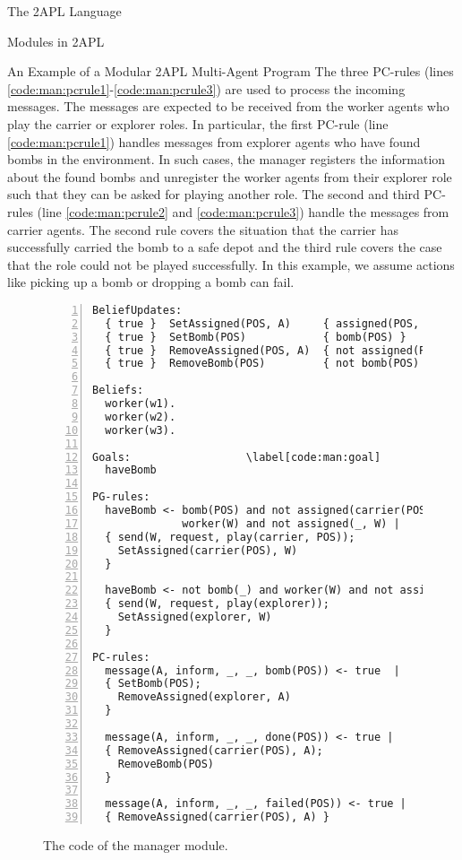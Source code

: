 \begin{chapter}{The 2APL Language}
\begin{section}{Modules in 2APL}
\begin{subsection}{An Example of a Modular 2APL Multi-Agent Program}
The three PC-rules (lines
\ref{code:man:pcrule1}-\ref{code:man:pcrule3}) are used to process
the incoming messages. The messages are expected to be received from
the worker agents who play the carrier or explorer roles. In
particular, the first PC-rule (line \ref{code:man:pcrule1}) handles
messages from explorer agents who have found bombs in the
environment. In such cases, the manager registers the information
about the found bombs and unregister the worker agents from their
explorer role such that they can be asked for playing another role.
The second and third PC-rules (line \ref{code:man:pcrule2} and
\ref{code:man:pcrule3}) handle the messages from carrier agents. The
second rule covers the situation that the carrier has successfully
carried the bomb to a safe depot and the third rule covers the case
that the role could not be played successfully. In this example, we
assume actions like picking up a bomb or dropping a bomb can fail.

\begin{figure}[H]
\begin{Verbatim}[frame=single,numbers=left,firstnumber=last,
                 numbersep=2pt,commandchars=\\\[\]]
BeliefUpdates:
  { true }  SetAssigned(POS, A)     { assigned(POS, A) }
  { true }  SetBomb(POS)            { bomb(POS) }
  { true }  RemoveAssigned(POS, A)  { not assigned(POS, A) }
  { true }  RemoveBomb(POS)         { not bomb(POS) }

Beliefs:
  worker(w1).
  worker(w2).
  worker(w3).

Goals:                  \label[code:man:goal]
  haveBomb

PG-rules:
  haveBomb <- bomb(POS) and not assigned(carrier(POS), _) and \label[code:man:pgrule1]
              worker(W) and not assigned(_, W) |
  { send(W, request, play(carrier, POS));
    SetAssigned(carrier(POS), W)
  }

  haveBomb <- not bomb(_) and worker(W) and not assigned( _, W) | \label[code:man:pgrule2]
  { send(W, request, play(explorer));
    SetAssigned(explorer, W)
  }

PC-rules:
  message(A, inform, _, _, bomb(POS)) <- true  |            \label[code:man:pcrule1]
  { SetBomb(POS);
    RemoveAssigned(explorer, A)
  }

  message(A, inform, _, _, done(POS)) <- true |             \label[code:man:pcrule2]
  { RemoveAssigned(carrier(POS), A);
    RemoveBomb(POS)
  }

  message(A, inform, _, _, failed(POS)) <- true |          \label[code:man:pcrule3]
  { RemoveAssigned(carrier(POS), A) }
\end{Verbatim}
\caption{The code of the manager module.}\label{fig:managercode}
\end{figure}


\end{subsection}
\end{section}
\end{chapter}
